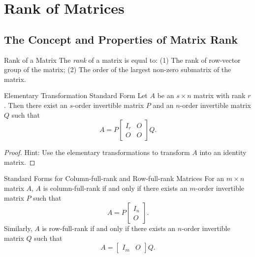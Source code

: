
\section{Rank of Matrices}

\subsection{The Concept and Properties of Matrix Rank}

\begin{definition}{Rank of a Matrix}{}
  The \emph{rank} of a matrix is equal to:
  (1) The rank of row-vector group of the matrix;
  (2) The order of the largest non-zero submatrix of the matrix.
\end{definition}

\begin{proposition}{Elementary Transformation Standard Form}{}
  Let $A$ be an $s \times n$ matrix with rank $r$.
  Then there exist an $s$-order invertible matrix $P$
  and an $n$-order invertible matrix $Q$ such that
  \begin{equation}
    A = P \left[
      \begin{array}{cc}
        I_r & O\\
         O  & O
      \end{array}
    \right] Q.
  \end{equation}
\end{proposition}

\begin{proof}
  Hint: Use the elementary transformations to transform $A$ into an identity matrix.
\end{proof}

\begin{corollary}{Standard Forms for Column-full-rank and Row-full-rank Matrices}{}
  For an $m \times n$ matrix $A$,
  $A$ is column-full-rank if and only if there exists an $m$-order invertible
  matrix $P$ such that
  \begin{equation}
    A = P \left[
      \begin{array}{c}
        I_n\\
        O
      \end{array}
    \right].
  \end{equation}
  Similarly, $A$ is row-full-rank if and only if there exists an $n$-order invertible
  matrix $Q$ such that
  \begin{equation}
    A = \left[
      \begin{array}{cc}
        I_m&O
      \end{array}
    \right]Q.
  \end{equation}
\end{corollary}

